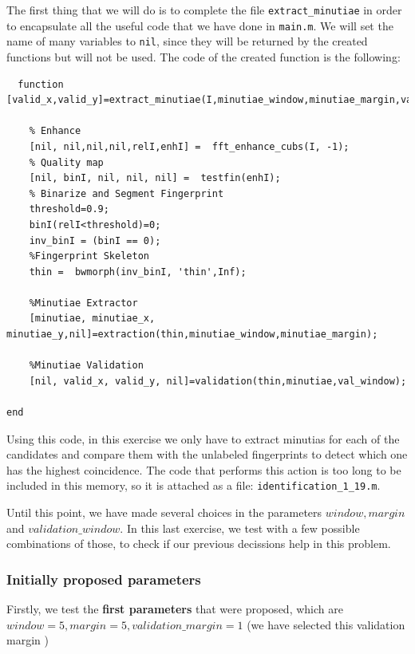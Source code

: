 \documentclass[a4paper]{article}
\def\inline{\lstinline[basicstyle=\ttfamily,keywordstyle={}]}
\begin{document}
The first thing that we will do is to complete the file \inline{extract_minutiae} in order to encapsulate all the useful code that we have done in \inline{main.m}. We will set the name of many variables to \inline{nil}, since they will be returned by the created functions but will not be used. The code of the created function is the following:

\begin{verbatim}
  function [valid_x,valid_y]=extract_minutiae(I,minutiae_window,minutiae_margin,val_window)

    % Enhance
    [nil, nil,nil,nil,relI,enhI] =  fft_enhance_cubs(I, -1);
    % Quality map
    [nil, binI, nil, nil, nil] =  testfin(enhI);  
    % Binarize and Segment Fingerprint
    threshold=0.9; 
    binI(relI<threshold)=0; 
    inv_binI = (binI == 0);
    %Fingerprint Skeleton
    thin =  bwmorph(inv_binI, 'thin',Inf);

    %Minutiae Extractor          
    [minutiae, minutiae_x, minutiae_y,nil]=extraction(thin,minutiae_window,minutiae_margin);

    %Minutiae Validation
    [nil, valid_x, valid_y, nil]=validation(thin,minutiae,val_window);

end
\end{verbatim}

Using this code, in this exercise we only have to extract minutias for each of the candidates and compare them with the unlabeled fingerprints to detect which one has the highest coincidence. The code that performs this action is too long to be included in this memory, so it is attached as a file: \inline{identification_1_19.m}.

Until this point, we have made several choices in the parameters \(window,margin\) and  \(validation\_window\). In this last exercise, we test with a few possible combinations of those, to check if our previous decissions help in this problem.

\subsubsection{Initially proposed parameters}

Firstly, we test the \textbf{first parameters} that were proposed, which are \(window = 5, margin = 5,validation\_margin = 1\) (we have selected this validation margin )
\end{document}
